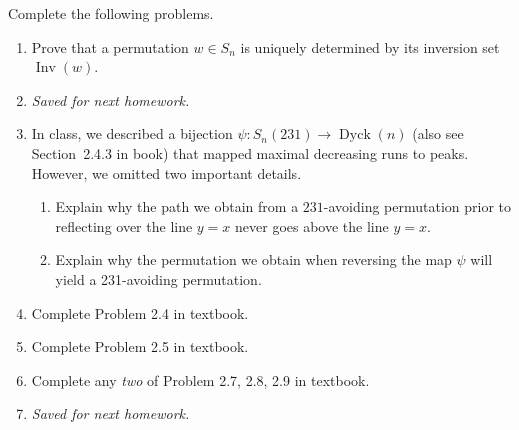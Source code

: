 \documentclass[11pt]{article}%
\theoremstyle{definition}
\DeclareMathOperator{\Des}{Des}
\DeclareMathOperator{\Inv}{Inv}
\DeclareMathOperator{\inv}{inv}
\DeclareMathOperator{\area}{area}
\DeclareMathOperator{\Dyck}{Dyck}
\begin{document}
Complete the following problems. 
\begin{enumerate}
\item Prove that a permutation $w\in S_n$ is uniquely determined by its inversion set $\Inv(w)$.
\item \emph{Saved for next homework.}
\item In class, we described a bijection $\psi:S_n(231)\to \Dyck(n)$ (also see Section~2.4.3 in book) that mapped maximal decreasing runs to peaks. However, we omitted two important details.
\begin{enumerate}
\item Explain why the path we obtain from a $231$-avoiding permutation prior to reflecting over the line $y=x$ never goes above the line $y=x$.
\item Explain why the permutation we obtain when reversing the map $\psi$ will yield a 231-avoiding permutation.
\end{enumerate}
\item Complete Problem 2.4 in textbook.
\item Complete Problem 2.5 in textbook.
\item Complete any \emph{two} of Problem 2.7, 2.8, 2.9 in textbook.
\item \emph{Saved for next homework.}
\end{enumerate}
\end{document}
